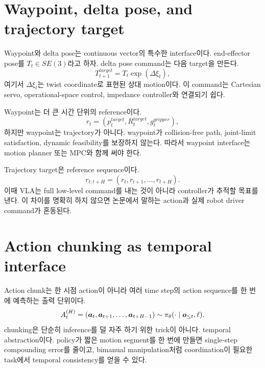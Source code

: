 \section{Waypoint, delta pose, and trajectory target}

Waypoint와 delta pose는 continuous vector의 특수한 interface이다. end-effector pose를 $T_t\in SE(3)$라고 하자. delta pose command는 다음 target을 만든다.
\begin{equation}
  T_{t+1}^{target}
  =
  T_t \exp(\Delta \xi_t),
  \label{eq:ch13-delta-pose}
\end{equation}
여기서 $\Delta \xi_t$는 twist coordinate로 표현된 상대 motion이다. 이 command는 Cartesian servo, operational-space control, impedance controller와 연결되기 쉽다.

Waypoint는 더 큰 시간 단위의 reference이다.
\begin{equation}
  r_t
  =
  (p_t^{target},R_t^{target},g_t^{gripper}),
  \label{eq:ch13-waypoint}
\end{equation}
하지만 waypoint는 trajectory가 아니다. waypoint가 collision-free path, joint-limit satisfaction, dynamic feasibility를 보장하지 않는다. 따라서 waypoint interface는 motion planner 또는 MPC와 함께 써야 한다.

Trajectory target은 reference sequence이다.
\begin{equation}
  r_{t:t+H}
  =
  (r_t,r_{t+1},\ldots,r_{t+H}).
  \label{eq:ch13-trajectory-target}
\end{equation}
이때 VLA는 full low-level command를 내는 것이 아니라 controller가 추적할 목표를 낸다. 이 차이를 명확히 하지 않으면 논문에서 말하는 action과 실제 robot driver command가 혼동된다.

\section{Action chunking as temporal interface}

Action chunk는 한 시점 action이 아니라 여러 time step의 action sequence를 한 번에 예측하는 출력 단위이다.
\begin{equation}
  A_t^{(H)}
  =
  (\bm{a}_t,\bm{a}_{t+1},\ldots,\bm{a}_{t+H-1})
  \sim
  \pi_{\theta}
  (\cdot \mid \bm{o}_{\leq t},\ell).
  \label{eq:ch13-action-chunk}
\end{equation}
chunking은 단순히 inference를 덜 자주 하기 위한 trick이 아니다. temporal abstraction이다. policy가 짧은 motion segment를 한 번에 만들면 single-step compounding error를 줄이고, bimanual manipulation처럼 coordination이 필요한 task에서 temporal consistency를 얻을 수 있다.


